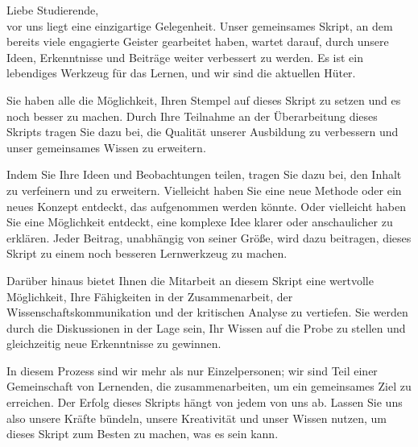 \documentclass[a4paper]{article}
\begin{document}
Liebe Studierende,\\ vor uns liegt eine einzigartige Gelegenheit. Unser gemeinsames Skript, an dem bereits viele engagierte Geister gearbeitet haben, wartet darauf, durch unsere Ideen, Erkenntnisse und Beiträge weiter verbessert zu werden. Es ist ein lebendiges Werkzeug für das Lernen, und wir sind die aktuellen Hüter.

Sie haben alle die Möglichkeit, Ihren Stempel auf dieses Skript zu setzen und es noch besser zu machen. Durch Ihre Teilnahme an der Überarbeitung dieses Skripts tragen Sie dazu bei, die Qualität unserer Ausbildung zu verbessern und unser gemeinsames Wissen zu erweitern.

Indem Sie Ihre Ideen und Beobachtungen teilen, tragen Sie dazu bei, den Inhalt zu verfeinern und zu erweitern. Vielleicht haben Sie eine neue Methode oder ein neues Konzept entdeckt, das aufgenommen werden könnte. Oder vielleicht haben Sie eine Möglichkeit entdeckt, eine komplexe Idee klarer oder anschaulicher zu erklären. Jeder Beitrag, unabhängig von seiner Größe, wird dazu beitragen, dieses Skript zu einem noch besseren Lernwerkzeug zu machen.

Darüber hinaus bietet Ihnen die Mitarbeit an diesem Skript eine wertvolle Möglichkeit, Ihre Fähigkeiten in der Zusammenarbeit, der Wissenschaftskommunikation und der kritischen Analyse zu vertiefen. Sie werden durch die Diskussionen in der Lage sein, Ihr Wissen auf die Probe zu stellen und gleichzeitig neue Erkenntnisse zu gewinnen.

In diesem Prozess sind wir mehr als nur Einzelpersonen; wir sind Teil einer Gemeinschaft von Lernenden, die zusammenarbeiten, um ein gemeinsames Ziel zu erreichen. Der Erfolg dieses Skripts hängt von jedem von uns ab. Lassen Sie uns also unsere Kräfte bündeln, unsere Kreativität und unser Wissen nutzen, um dieses Skript zum Besten zu machen, was es sein kann.
\end{document}

